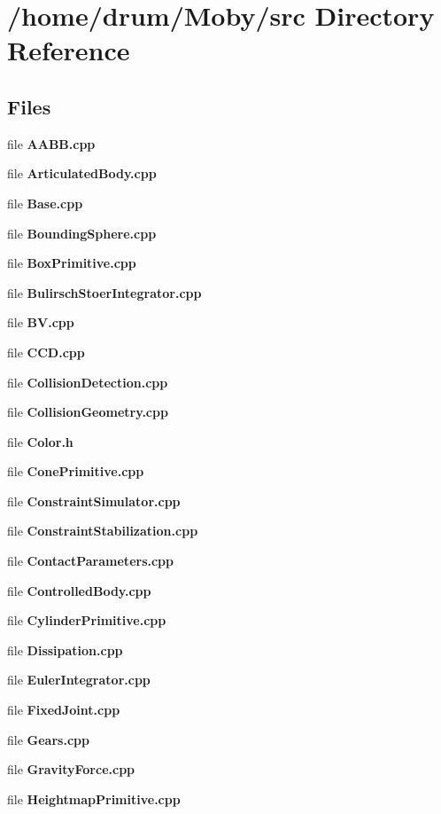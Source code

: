 \section{/home/drum/\-Moby/src Directory Reference}
\label{dir_68267d1309a1af8e8297ef4c3efbcdba}
\subsection*{Files}
\begin{DoxyCompactItemize}
\item 
file {\bfseries A\-A\-B\-B.\-cpp}
\item 
file {\bfseries Articulated\-Body.\-cpp}
\item 
file {\bfseries Base.\-cpp}
\item 
file {\bfseries Bounding\-Sphere.\-cpp}
\item 
file {\bfseries Box\-Primitive.\-cpp}
\item 
file {\bfseries Bulirsch\-Stoer\-Integrator.\-cpp}
\item 
file {\bfseries B\-V.\-cpp}
\item 
file {\bfseries C\-C\-D.\-cpp}
\item 
file {\bfseries Collision\-Detection.\-cpp}
\item 
file {\bfseries Collision\-Geometry.\-cpp}
\item 
file {\bfseries Color.\-h}
\item 
file {\bfseries Cone\-Primitive.\-cpp}
\item 
file {\bfseries Constraint\-Simulator.\-cpp}
\item 
file {\bfseries Constraint\-Stabilization.\-cpp}
\item 
file {\bfseries Contact\-Parameters.\-cpp}
\item 
file {\bfseries Controlled\-Body.\-cpp}
\item 
file {\bfseries Cylinder\-Primitive.\-cpp}
\item 
file {\bfseries Dissipation.\-cpp}
\item 
file {\bfseries Euler\-Integrator.\-cpp}
\item 
file {\bfseries Fixed\-Joint.\-cpp}
\item 
file {\bfseries Gears.\-cpp}
\item 
file {\bfseries Gravity\-Force.\-cpp}
\item 
file {\bfseries Heightmap\-Primitive.\-cpp}
\item 

\end{DoxyCompactItemize}
